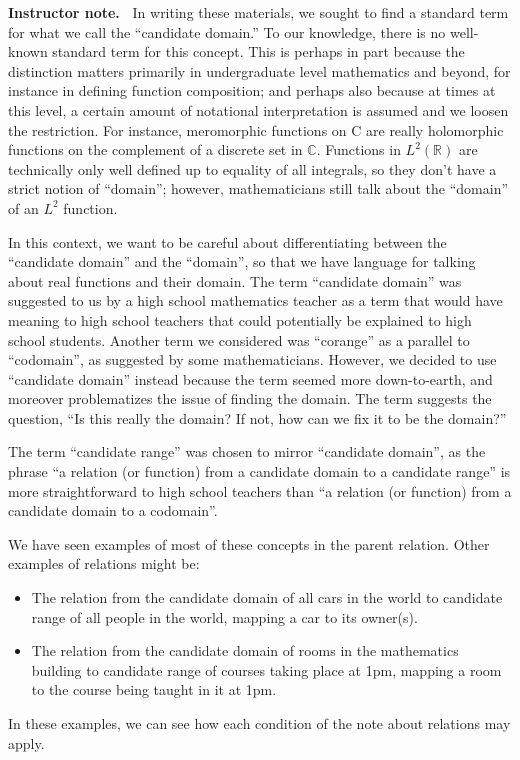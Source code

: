 \documentclass[11pt]{article}
\newenvironment{bignote}[1][Instructor note]%
	{\begin{mdframed}\raggedright{\bf #1.~}}
	{\end{mdframed}}
\theoremstyle{definition}
\begin{document}
\begin{bignote}
In writing these materials, we sought to find a standard term for what we call the ``candidate domain.'' To our knowledge, there is no well-known standard term for this concept. This is perhaps in part because the distinction matters primarily in undergraduate level mathematics and beyond, for instance in defining function composition; and perhaps also because at times at this level, a certain amount of notational interpretation is assumed and we loosen the restriction. For instance, meromorphic functions on C are really holomorphic functions on the complement of a discrete set in $\mathbb{C}$. Functions in
$L^2(\mathbb{R})$ are technically only well defined up to equality of all integrals, so
they don't have a strict notion of  ``domain''; however, mathematicians still talk about the ``domain'' of an  $L^2$ function.

In this context, we want to be careful about differentiating between the ``candidate domain'' and the ``domain'', so that we have language for talking about real functions and their domain. The term ``candidate domain'' was suggested to us by a high school mathematics teacher as a term that would have meaning to high school teachers that could potentially be explained to high school students. Another term we considered was ``corange'' as a parallel to ``codomain'', as suggested by some mathematicians. However, we decided to use ``candidate domain'' instead because the term seemed more down-to-earth, and moreover problematizes the issue of finding the domain. The term suggests the question, ``Is this really the domain? If not, how can we fix it to be the domain?''

The term ``candidate range'' was chosen to mirror ``candidate domain'', as the phrase ``a relation (or function) from a candidate domain to a candidate range'' is more straightforward to high school teachers than ``a relation (or function) from a candidate domain to a codomain''.  \end{bignote}

We have seen examples of most of these concepts in the parent relation. Other examples of relations might be:
	\begin{itemize}
	\item The relation from the candidate domain of all cars in the world to candidate range of all people in the world, mapping a car to its owner(s).
	\item The relation from the candidate domain of rooms in the mathematics building to candidate range of courses taking place at 1pm, mapping a room to the course being taught in it at 1pm.
	\end{itemize}
In these examples, we can see how each condition of the note about relations may apply.
\end{document}

